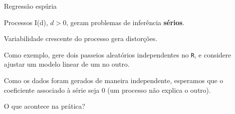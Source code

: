 \documentclass[11pt]{beamer}
\newenvironment{halfwideitemize}{\itemize\addtolength{\itemsep}{0.5em}}{\enditemize}
\begin{document}
\begin{frame}{Regressão espúria}
	\begin{halfwideitemize}
		\item Processos I(d), $d>0$, geram problemas de inferência \textbf{sérios}.
		\begin{halfwideitemize}
			\item Variabilidade crescente do processo gera distorções.
		\end{halfwideitemize}
		\item Como exemplo, gere dois passeios aleatórios {\color{blue}independentes} no \texttt{R}, e considere ajustar um modelo linear de um no outro.
		\item Como os dados foram gerados de maneira {\color{blue}independente}, esperamos que o coeficiente associado à série seja 0 (um processo não explica o outro).
		\item O que acontece na prática?
	\end{halfwideitemize}
\end{frame}
\end{document}
